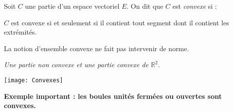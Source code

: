 \documentclass[a4paper,10pt]{report}
\begin{document}
\begin{defin} Soit $C$ une partie d'un espace vectoriel $E$. On dit que $C$ est \textit{convexe} si :

\vspace{1cm}

\end{defin}

\begin{rems} 
\item $C$ est convexe si et seulement si il contient tout segment dont il contient les extrémités.
\item La notion d'ensemble convexe ne fait pas intervenir de norme.
\end{rems}

\begin{center}
\textit{Une partie non convexe et une partie convexe de $\mathbb{R}^2$.}
\end{center}

\begin{center}
\texttt{[image: Convexes]}
\end{center}

\noindent \textbf{Exemple important : les boules unités fermées ou ouvertes sont convexes.}


\vspace{6cm}
%
\end{document}
